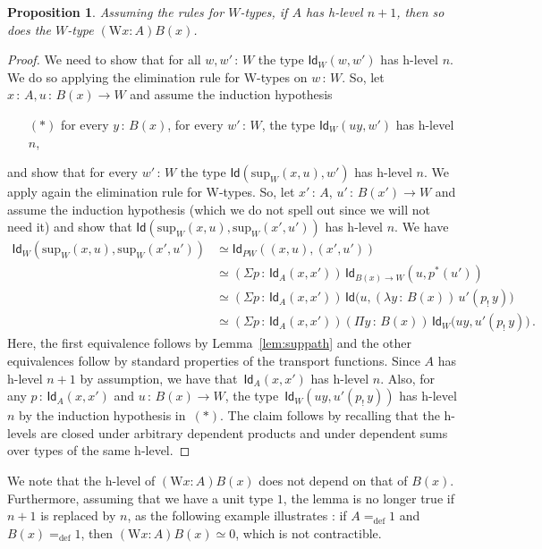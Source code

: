 \documentclass[10pt,a4paper,oneside,reqno]{amsart}
\numberwithin{equation}{section}
\theoremstyle{mythm}
\newtheorem{proposition}[theorem]{Proposition}
\theoremstyle{mydef}
\theoremstyle{myrmk}
\newcommand{\defeq}{=_{\mathrm{def}}}
\newcommand{\co}{\,{:}\,}
\newcommand{\Id}{\mathsf{Id}}
\newcommand{\W}{\mathrm{W}}
\renewcommand{\sup}{\mathrm{sup}}
\begin{document}
\begin{proposition}\label{thm:Whlevel}
Assuming the rules for $W$-types, if $A$ has h-level $n+1$, then so does the $W$-type $(\W x:A)B(x)$.
\end{proposition}

\begin{proof}
We need to show that for all $w, w' \co W$ the type $\Id_W(w, w')$ has h-level $n$. We do so applying the elimination
rule for W-types on $w \co W$.  So, let $x \co A, u \co B(x) \to W$ and assume the induction hypothesis 
\begin{itemize}
\item[$(\ast)$] for every $y \co B(x)$, for every $w' \co W$,  the type $\Id_W( uy ,w')$ has h-level $n$, 
\end{itemize}
and show that for every $w' \co W$ the type $\Id(\sup_W(x,u), w')$ has h-level $n$. We apply again the elimination rule for W-types. So, let   $x' \co A$, $u' \co B(x') \to W$ and assume the induction hypothesis (which we do not spell out since we will not need it) and show that $\Id( \sup_W(x,u) , \sup_W(x',u'))$ has h-level $n$. We have
\begin{align*} 
\Id_W(\sup_W(x,u), \sup_W(x',u'))
& \simeq \Id_{PW}((x,u) , (x',u')) \\
& \simeq (\Sigma p \co \Id_A(x, x')) \, \Id_{B(x) \to W}( u , p^*(u') )   \\
& \simeq (\Sigma p \co \Id_A(x,x')) \,  \Id\big(u , (\lambda y \co B(x)) \,  u'( p_{!} \, y)\big) \\
& \simeq (\Sigma p \co \Id_A(x,x')) (\Pi y \co B(x)) \, \Id_W \big( uy  , u'(p_{!} \, y)\big) \, .
\end{align*}
Here, the first equivalence follows by Lemma~\ref{lem:suppath} and the other equivalences follow by standard
properties of the transport functions. Since $A$ has h-level $n+1$ by assumption, we have 
that~$\Id_A(x,x')$ has h-level $n$. Also, for any $p \co \Id_A(x,x')$ and $u \co B(x) \to W$, the 
type~$\Id_W(uy ,  u'(p_{!} \, y))$ has h-level $n$ by the 
induction hypothesis in~$(\ast)$. The claim follows by recalling that the h-levels are closed under arbitrary dependent products and under dependent sums over types of the same h-level. 
\end{proof}

We note that the h-level of $(\W x:A) B(x)$ does not depend on that of $B(x)$. Furthermore, assuming that we have a unit type $1$, the lemma is no longer true if $n+1$ is replaced by $n$, as the following example illustrates : if $A \defeq 1$ and~$B(x) \defeq 1$, then $(\W x:A) B(x) \simeq 0$, which is not contractible. 
\end{document}
